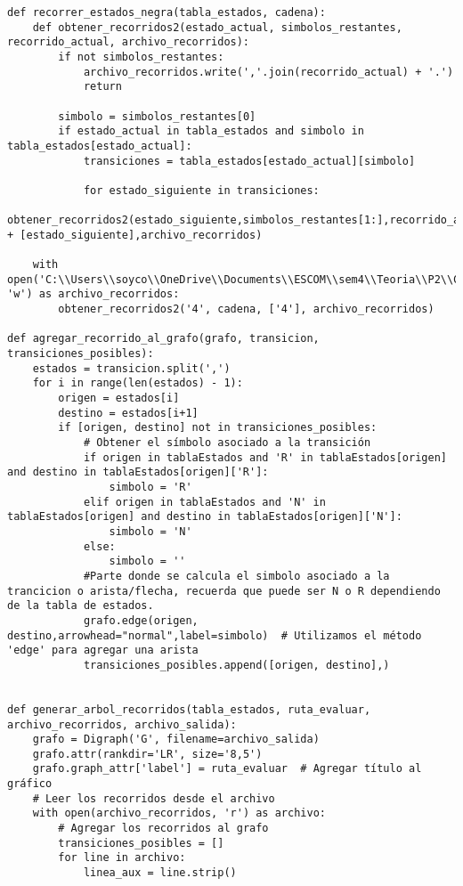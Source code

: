 \begin{lstlisting}
def recorrer_estados_negra(tabla_estados, cadena):
    def obtener_recorridos2(estado_actual, simbolos_restantes, recorrido_actual, archivo_recorridos):
        if not simbolos_restantes:
            archivo_recorridos.write(','.join(recorrido_actual) + '.')
            return

        simbolo = simbolos_restantes[0]
        if estado_actual in tabla_estados and simbolo in tabla_estados[estado_actual]:
            transiciones = tabla_estados[estado_actual][simbolo]

            for estado_siguiente in transiciones:
                obtener_recorridos2(estado_siguiente,simbolos_restantes[1:],recorrido_actual + [estado_siguiente],archivo_recorridos)

    with open('C:\\Users\\soyco\\OneDrive\\Documents\\ESCOM\\sem4\\Teoria\\P2\\Chess\\output\\recorridos_negra.txt', 'w') as archivo_recorridos:
        obtener_recorridos2('4', cadena, ['4'], archivo_recorridos)

def agregar_recorrido_al_grafo(grafo, transicion, transiciones_posibles):
    estados = transicion.split(',')
    for i in range(len(estados) - 1):
        origen = estados[i]
        destino = estados[i+1]
        if [origen, destino] not in transiciones_posibles:
            # Obtener el símbolo asociado a la transición
            if origen in tablaEstados and 'R' in tablaEstados[origen] and destino in tablaEstados[origen]['R']:
                simbolo = 'R'
            elif origen in tablaEstados and 'N' in tablaEstados[origen] and destino in tablaEstados[origen]['N']:
                simbolo = 'N'
            else:
                simbolo = ''
            #Parte donde se calcula el simbolo asociado a la trancicion o arista/flecha, recuerda que puede ser N o R dependiendo de la tabla de estados.
            grafo.edge(origen, destino,arrowhead="normal",label=simbolo)  # Utilizamos el método 'edge' para agregar una arista
            transiciones_posibles.append([origen, destino],)
    

def generar_arbol_recorridos(tabla_estados, ruta_evaluar, archivo_recorridos, archivo_salida):
    grafo = Digraph('G', filename=archivo_salida)
    grafo.attr(rankdir='LR', size='8,5')
    grafo.graph_attr['label'] = ruta_evaluar  # Agregar título al gráfico
    # Leer los recorridos desde el archivo
    with open(archivo_recorridos, 'r') as archivo:
        # Agregar los recorridos al grafo
        transiciones_posibles = []
        for line in archivo:
            linea_aux = line.strip()
            

\end{lstlisting}
